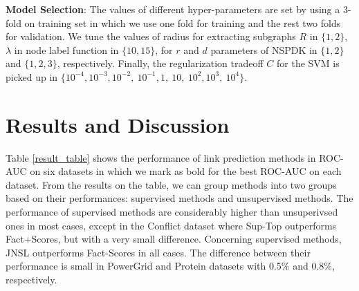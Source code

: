 \documentclass[runningheads,a4paper]{llncs}
\begin{document}
\textbf{Model Selection}: The values of different hyper-parameters are set by using a 3-fold on training set in which we use one fold for training and the rest two folds for validation. We tune the values of radius for extracting subgraphs $R$ in $\lbrace 1, 2 \rbrace$, $\lambda$ in node label function in $\lbrace 10, 15 \rbrace$, for $r$ and $d$ parameters of NSPDK in $\lbrace  1, 2 \rbrace$ and $\lbrace  1, 2, 3 \rbrace$, respectively. Finally, the regularization tradeoff $C$ for the SVM is picked up in $\lbrace 10^{-4}, 10^{-3}, 10^{-2},\ 10^{-1}, 1,\ 10,\ 10^2, 10^3,\ 10^4 \rbrace$.

\section{Results and Discussion}
Table \ref{result_table} shows the performance of link prediction methods in ROC-AUC on six datasets in which we mark as bold for the best ROC-AUC on each dataset. From the results on the table, we can group methods into two groups based on their performances: supervised methods and unsupervised methods. The performance of supervised methods are considerably higher than unsuperivsed ones in most cases, except in the Conflict dataset where Sup-Top outperforms Fact+Scores, but with a very small difference. Concerning supervised methods, JNSL outperforms Fact-Scores in all cases. The difference between their performance is small in PowerGrid and Protein datasets with 0.5$\%$ and 0.8$\%$, respectively.
\end{document}

